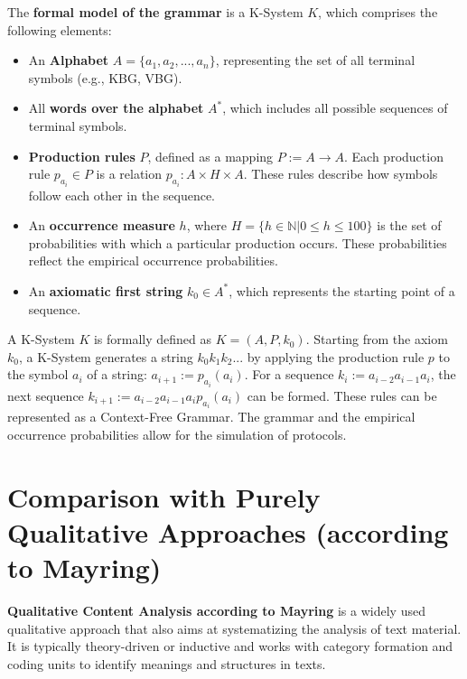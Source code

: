 \documentclass{article}
\begin{document}
The \textbf{formal model of the grammar} is a K-System $K$, which comprises the following elements:
\begin{itemize}
    \item An \textbf{Alphabet} $A=\{a_{1},a_{2},...,a_{n}\}$, representing the set of all terminal symbols (e.g., KBG, VBG).
    \item All \textbf{words over the alphabet} $A^{*}$, which includes all possible sequences of terminal symbols.
    \item \textbf{Production rules} $P$, defined as a mapping $P:=A\rightarrow A$. Each production rule $p_{a_{i}}\in P$ is a relation $p_{a_{i}}:A\times H\times A$. These rules describe how symbols follow each other in the sequence.
    \item An \textbf{occurrence measure} $h$, where $H=\{h\in \mathbb{N}|0\le h\le100\}$ is the set of probabilities with which a particular production occurs. These probabilities reflect the empirical occurrence probabilities.
    \item An \textbf{axiomatic first string} $k_{0}\in A^{*}$, which represents the starting point of a sequence.
\end{itemize}
A K-System $K$ is formally defined as $K=(A,P,k_{0})$. Starting from the axiom $k_{0}$, a K-System generates a string $k_{0}k_{1}k_{2}...$ by applying the production rule $p$ to the symbol $a_{i}$ of a string: $a_{i+1}:=p_{a_{i}}(a_{i})$. For a sequence $k_{i}:=a_{i-2}a_{i-1}a_{i}$, the next sequence $k_{i+1}:=a_{i-2}a_{i-1}a_{i}p_{a_{i}}(a_{i})$ can be formed. These rules can be represented as a Context-Free Grammar. The grammar and the empirical occurrence probabilities allow for the simulation of protocols.

\section{Comparison with Purely Qualitative Approaches (according to Mayring)}
\textbf{Qualitative Content Analysis according to Mayring} is a widely used qualitative approach that also aims at systematizing the analysis of text material. It is typically theory-driven or inductive and works with category formation and coding units to identify meanings and structures in texts.
\end{document}
